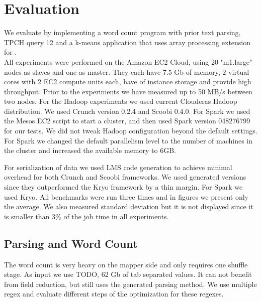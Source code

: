 \section{Evaluation}
\label{sec:evaluation}


We evaluate \tool by implementing a word count program with prior text parsing, TPCH query 12 and a k-means application that uses array processing extension for \tool. \\

All experiments were performed on the Amazon EC2 Cloud, using 20 "m1.large" nodes as slaves and one as master. They each have 7.5 Gb of memory, 2 virtual cores with 2 EC2 compute units each, have  of instance storage and provide high throughput. Prior to the experiments we have measured up to 50 MB/s between two nodes. For the Hadoop experiments we used current Clouderas Hadoop distribution. We used Crunch version 0.2.4 and Scoobi 0.4.0. For Spark we used the Mesos  EC2 script to start a cluster, and then used Spark version 048276799 for our tests. We did not tweak Hadoop configuration beyond the default settings. For Spark we changed the default parallelism level to the number of machines in the cluster and increased the available memory to 6GB. 


For serialization of data we used LMS code generation to achieve minimal overhead for both Crunch and Scoobi frameworks. We used generated versions since they outperformed the Kryo framework by a thin margin. For Spark we used Kryo. All benchmarks were run three times and in figures we present only the average. We also measured standard deviation but it is not displayed since it is smaller than 3\% of the job time in all experiments.


\subsection{Parsing and Word Count}
\label{subsec:parsing-word-count}

The word count is very heavy on the mapper side and only requires one shuffle stage. As input we use TODO, 62 Gb of tab separated values. It can not benefit from field reduction, but still uses the generated parsing method. We use multiple regex and evaluate different steps of the optimization for these regexes.

